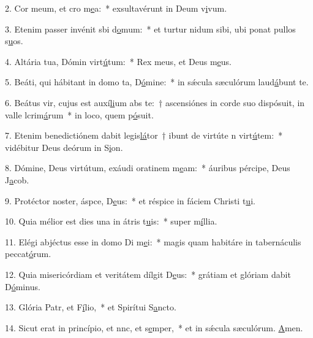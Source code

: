 2. Cor meum, et cro m\uline{e}a:~* exsultavérunt in Deum v\uline{i}vum.\par 
3. Etenim passer invénit sbi d\uline{o}mum:~* et turtur nidum sibi, ubi ponat pullos s\uline{u}os.\par 
4. Altária tua, Dómin virt\uline{ú}tum:~* Rex meus, et Deus m\uline{e}us.\par 
5. Beáti, qui hábitant in domo ta, D\uline{ó}mine:~* in sǽcula sæculórum laud\uline{á}bunt te.\par 
6. Beátus vir, cujus est auxí\uline{li}um abs te:~† ascensiónes in corde suo dispósuit, in valle lcrim\uline{á}rum~* in loco, quem p\uline{ó}suit.\par 
7. Etenim benedictiónem dabit legis\uline{lá}tor~† ibunt de virtúte n virt\uline{ú}tem:~* vidébitur Deus deórum in S\uline{i}on.\par 
8. Dómine, Deus virtútum, exáudi oratinem m\uline{e}am:~* áuribus pércipe, Deus J\uline{a}cob.\par 
9. Protéctor noster, áspce, D\uline{e}us:~* et réspice in fáciem Christi t\uline{u}i.\par 
10. Quia mélior est dies una in átris t\uline{u}is:~* super m\uline{í}llia.\par 
11. Elégi abjéctus esse in domo Di m\uline{e}i:~* magis quam habitáre in tabernáculis peccat\uline{ó}rum.\par 
12. Quia misericórdiam et veritátem dílgit D\uline{e}us:~* grátiam et glóriam dabit D\uline{ó}minus.\par 
13. Glória Patr, et F\uline{í}lio,~* et Spirítui S\uline{a}ncto.\par 
14. Sicut erat in princípio, et nnc, et s\uline{e}mper,~* et in sǽcula sæculórum. \uline{A}men.\par 
